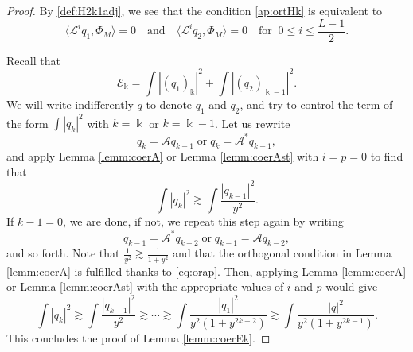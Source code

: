 \documentclass[11pt]{aims}
\theoremstyle{definition}
\numberwithin{equation}{section}
\begin{document}
\begin{proof} By \eqref{def:H2k1adj}, we see that the condition \eqref{ap:ortHk} is equivalent to 
\begin{equation}\label{eq:orap}
\big \langle {\mathscr{L}}^iq_1,  \Phi_M \big \rangle = 0 \quad \text{and} \quad \big \langle {\mathscr{L}}^{i}q_2,  \Phi_M \big \rangle = 0 \quad \text{for} \;\; 0 \leq i \leq \frac{L-1}{2}.
\end{equation}

Recall that 
\begin{equation}
{\mathscr{E}}_\Bbbk = \int |(q_1)_{\Bbbk}|^2 + \int |(q_2)_{\Bbbk - 1}|^2.
\end{equation}
We will write indifferently $q$ to denote $q_1$ and $q_2$, and try to control the term of the form 
$\int |q_{k}|^2$ with $k = \Bbbk$ or $k = \Bbbk - 1$. Let us rewrite
$$q_k = {\mathscr{A}} q_{k - 1} \; \text{or}\; q_k = {\mathscr{A}}^*q_{k-1},$$
and apply Lemma \ref{lemm:coerA} or Lemma \ref{lemm:coerAst} with $i = p = 0$ to find that
$$\int |q_k|^2 \gtrsim \int \frac{|q_{k - 1}|^2}{y^2}.$$
If $k - 1 = 0$, we are done, if not, we repeat this step again by writing 
$$q_{k-1} = {\mathscr{A}}^* q_{k - 2} \; \text{or}\; q_{k-1} = {\mathscr{A}} q_{k-2},$$
and so forth. Note that $\frac{1}{y^2} \gtrsim \frac{1}{1 + y^2}$ and that the orthogonal condition in Lemma \ref{lemm:coerA} is fulfilled thanks to \eqref{eq:orap}. Then, applying Lemma \ref{lemm:coerA} or Lemma \ref{lemm:coerAst} with the appropriate values of $i$ and $p$ would give
$$\int |q_k|^2 \gtrsim \int \frac{|q_{k - 1}|^2}{y^2} \gtrsim \cdots \gtrsim \int \frac{|q_1|^2}{y^2(1 + y^{2k - 2})} \gtrsim \int \frac{|q|^2}{y^2(1 + y^{2k - 1})}.$$
This concludes the proof of Lemma \ref{lemm:coerEk}.
\end{proof}
\end{document}
